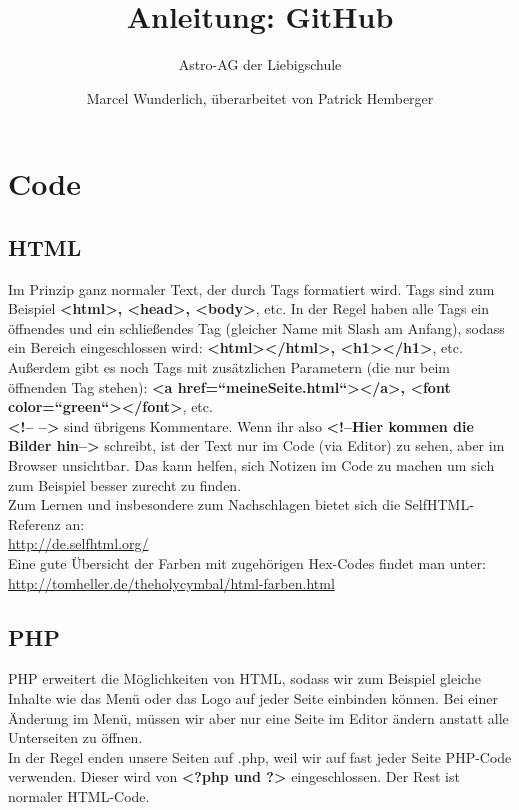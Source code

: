 \documentclass[12pt,a4paper,notitlepage,onecolumn,portrait,oneside, , , ]{scrartcl}
\begin{document}
\title{Anleitung: GitHub}
	\subtitle{Astro-AG der Liebigschule}
\author{Marcel Wunderlich, überarbeitet von Patrick Hemberger}

\maketitle

\section{Code}
\subsection{HTML}
Im Prinzip ganz normaler Text, der durch Tags formatiert wird. Tags sind zum Beispiel \textbf{<html>, <head>, <body>}, etc. In der Regel haben alle Tags ein öffnendes und ein schließendes Tag (gleicher Name mit Slash am Anfang), sodass ein Bereich eingeschlossen wird: \textbf{<html></html>, <h1></h1>}, etc. Außerdem gibt es noch Tags mit zusätzlichen Parametern (die nur beim öffnenden Tag stehen): \textbf{<a href=“meineSeite.html“></a>, <font color=“green“></font>}, etc.\\
\textbf{<!-- -->} sind übrigens Kommentare. Wenn ihr also \textbf{<!--Hier kommen die Bilder hin-->} schreibt, ist der Text nur im Code (via Editor) zu sehen, aber im Browser unsichtbar. Das kann helfen, sich Notizen im Code zu machen um sich zum Beispiel besser zurecht zu finden.\\
Zum Lernen und insbesondere zum Nachschlagen bietet sich die SelfHTML-Referenz an:\\
\url{http://de.selfhtml.org/} \\
Eine gute Übersicht der Farben mit zugehörigen Hex-Codes findet man unter: \\
\url{http://tomheller.de/theholycymbal/html-farben.html} 

\subsection{PHP}
PHP erweitert die Möglichkeiten von HTML, sodass wir zum Beispiel gleiche Inhalte wie das Menü oder das Logo auf jeder Seite einbinden können. Bei einer Änderung im Menü, müssen wir aber nur eine Seite im Editor ändern anstatt alle Unterseiten zu öffnen. \\
In der Regel enden unsere Seiten auf .php, weil wir auf fast jeder Seite PHP-Code verwenden. Dieser wird von \textbf{<?php und ?>} eingeschlossen. Der Rest ist normaler HTML-Code.
\end{document}
